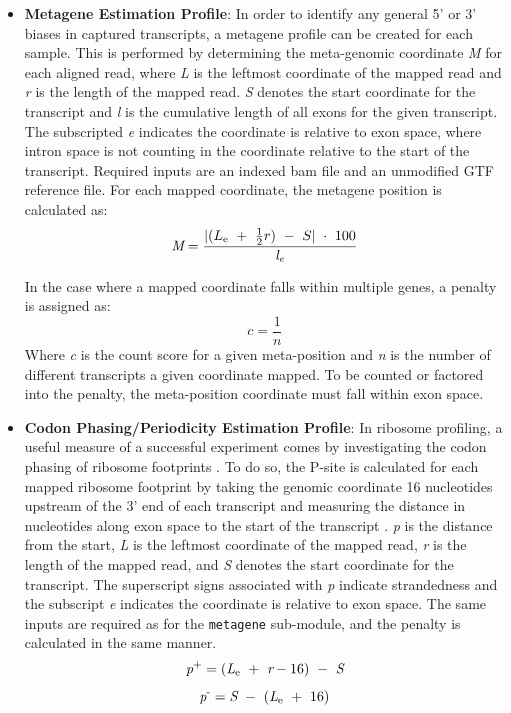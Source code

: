 \documentclass[11pt, a4paper, oneside]{article}
\begin{document}
\begin{enumerate}
\begin{itemize}
      \item \textbf{Metagene Estimation Profile}: In order to identify any general 5' or 3' biases in captured transcripts, a metagene profile can be created for each sample. This is performed by determining the meta-genomic coordinate \textit{M} for each aligned read, where \textit{L} is the leftmost coordinate of the mapped read and \textit{r} is the length of the mapped read. \textit{S} denotes the start coordinate for the transcript and \textit{l} is the cumulative length of all exons for the given transcript. The subscripted \textit{e} indicates the coordinate is relative to exon space, where intron space is not counting in the coordinate relative to the start of the transcript. Required inputs are an indexed bam file and an unmodified GTF reference file. For each mapped coordinate, the metagene position is calculated as:
      \begin{equation}
      \textit{M} = \frac{|(L\textsubscript{e}\ +\ \frac{1}{2}r)\ -\ S|\ \cdot\ 100}{\textit{l\textsubscript{e}}}
      \end{equation}

      In the case where a mapped coordinate falls within multiple genes, a penalty is assigned as:
      \begin{equation}
        \textit{c} = \frac{1}{\textit{n}}
      \end{equation}
      Where \textit{c} is the count score for a given meta-position and \textit{n} is the number of different transcripts a given coordinate mapped. To be counted or factored into the penalty, the meta-position coordinate must fall within exon space.

      \item \textbf{Codon Phasing/Periodicity Estimation Profile}: In ribosome profiling, a useful measure of a successful experiment comes by investigating the codon phasing of ribosome footprints \cite{}. To do so, the P-site is calculated for each mapped ribosome footprint by taking the genomic coordinate 16 nucleotides upstream of the 3' end of each transcript and measuring the distance in nucleotides along exon space to the start of the transcript \cite{}. \textit{p} is the distance from the start, \textit{L} is the leftmost coordinate of the mapped read, \textit{r} is the length of the mapped read, and \textit{S} denotes the start coordinate for the transcript. The superscript signs associated with \textit{p} indicate strandedness and the subscript \textit{e} indicates the coordinate is relative to exon space. The same inputs are required as for the \texttt{metagene} sub-module, and the penalty is calculated in the same manner.
      \begin{equation}
        \textit{p}\textsuperscript{+} = (\textit{L}\textsubscript{e}\ +\ \textit{r} - 16)\ -\ \textit{S}
      \end{equation}
      \begin{equation}
        \textit{p}\textsuperscript{-} = \textit{S}\ -\ (\textit{L}\textsubscript{e}\ +\ 16)
      \end{equation}

    \end{itemize}
\end{enumerate}
\end{document}
